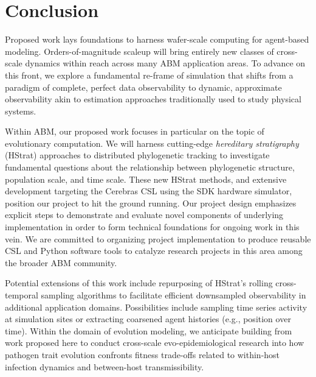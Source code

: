 \section{Conclusion} \label{sec:conclusion}

Proposed work lays foundations to harness wafer-scale computing for agent-based modeling.
Orders-of-magnitude scaleup will bring entirely new classes of cross-scale dynamics within reach across many ABM application areas.
To advance on this front, we explore a fundamental re-frame of simulation that shifts from a paradigm of complete, perfect data observability to dynamic, approximate observability akin to estimation approaches traditionally used to study physical systems.

Within ABM, our proposed work focuses in particular on the topic of evolutionary computation.
We will harness cutting-edge \textit{hereditary stratigraphy} (HStrat) approaches to distributed phylogenetic tracking to investigate fundamental questions about the relationship between phylogenetic structure, population scale, and time scale.
These new HStrat methods, and extensive development targeting the Cerebras CSL using the SDK hardware simulator, position our project to hit the ground running.
Our project design emphasizes explicit steps to demonstrate and evaluate novel components of underlying implementation in order to form technical foundations for ongoing work in this vein.
We are committed to organizing project implementation to produce reusable CSL and Python software tools to catalyze research projects in this area among the broader ABM community.

Potential extensions of this work include repurposing of HStrat's rolling cross-temporal sampling algorithms to facilitate efficient downsampled observability in additional application domains.
Possibilities include sampling time series activity at simulation sites or extracting coarsened agent histories (e.g., position over time).
Within the domain of evolution modeling, we anticipate building from work proposed here to conduct cross-scale evo-epidemiological research into how pathogen trait evolution confronts fitness trade-offs related to within-host infection dynamics and between-host transmissibility.

